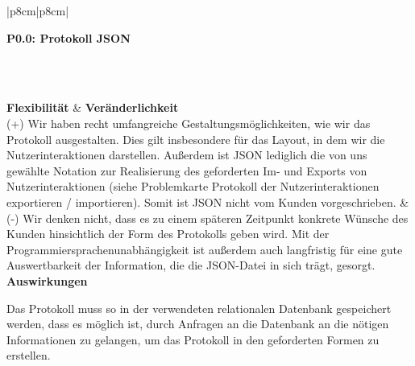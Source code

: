 \documentclass[enabledeprecatedfontcommands,fontsize=11pt,paper=a4,twoside]{scrartcl}
\newcounter{one}
\newcounter{two}[one]
\newcommand{\tone}{0\theone}
\newcommand{\two}{\stepcounter{two}0\thetwo}
\begin{document}
\begin{tabular} {|p{8cm}|p{8cm}|}
	\hline
	 {\parbox{16cm}{\textbf{\hypertarget{mm}{P\tone.\two}: Protokoll JSON}} } \\  \hline\hline 
	\rule{0pt}{5ex}\\ [3ex] \hline
	\textbf{Flexibilität}  & \textbf{Veränderlichkeit} \\
	(+) Wir haben recht umfangreiche Gestaltungsmöglichkeiten, wie wir das Protokoll ausgestalten. Dies gilt insbesondere für das Layout, in dem wir die Nutzerinteraktionen darstellen. Außerdem ist JSON lediglich die von uns gewählte Notation zur Realisierung des geforderten Im- und Exports von Nutzerinteraktionen (siehe Problemkarte \glqq Protokoll der Nutzerinteraktionen exportieren / importieren\grqq). Somit ist JSON nicht vom Kunden vorgeschrieben. &
	(-) Wir denken nicht, dass es zu einem späteren Zeitpunkt konkrete Wünsche des Kunden hinsichtlich der Form des Protokolls geben wird. Mit der Programmiersprachenunabhängigkeit ist außerdem auch langfristig für eine gute Auswertbarkeit der Information, die die JSON-Datei in sich trägt, gesorgt. \\
	\hline
	 {\textbf{Auswirkungen}} \\
	 {\parbox{16cm}{Das Protokoll muss so in der verwendeten relationalen Datenbank gespeichert werden, dass es möglich ist, durch Anfragen an die Datenbank an die nötigen Informationen zu gelangen, um das Protokoll in den geforderten Formen zu erstellen.}}\\ \hline
\end{tabular}

\newpage
\end{document}

